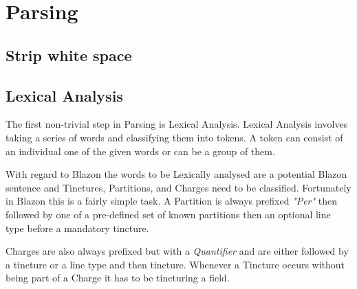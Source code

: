 \chapter{Parsing}



\section{Strip white space}

\section{Lexical Analysis} 

The first non-trivial step in Parsing is Lexical Analysis.  Lexical Analysis involves taking a series of words and classifying them into tokens.  A token can consist of an individual one of the given words or can be a group of them.  

With regard to Blazon the words to be Lexically analysed are a potential Blazon sentence and Tinctures, Partitions, and Charges need to be classified.  Fortunately in Blazon this is a fairly simple task.  A Partition is always prefixed \emph{"Per"} then followed by one of a pre-defined set of known partitions then an optional line type before a mandatory tincture. 


Charges are also always prefixed but with a \emph{Quantifier} and are either followed by a tincture or a line type and then tincture.  Whenever a Tincture occurs without being part of a Charge it has to be tincturing a field. 




